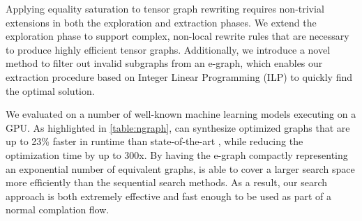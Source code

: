 
Applying equality saturation to tensor graph rewriting requires non-trivial extensions in both the exploration and extraction phases.
We extend the exploration phase to support complex, non-local rewrite rules that are necessary to produce highly efficient tensor graphs.
Additionally, we introduce a novel method to filter out invalid subgraphs from an e-graph,
which enables our extraction procedure based on Integer Linear Programming (ILP) to quickly find the optimal solution.

We evaluated \ourname{} on a number of well-known machine learning models executing on a GPU.
As highlighted in \autoref{table:ngraph}, \ourname{} can synthesize optimized graphs that are up to 23\% faster in runtime than state-of-the-art \cite{taso}, while reducing the optimization time by up to 300x.
By having the e-graph compactly representing an exponential number of equivalent graphs, \ourname{} is able to cover a larger search space more efficiently than the sequential search methods.
As a result, our search approach is both extremely effective and fast enough to be used as part of a normal complation flow.

